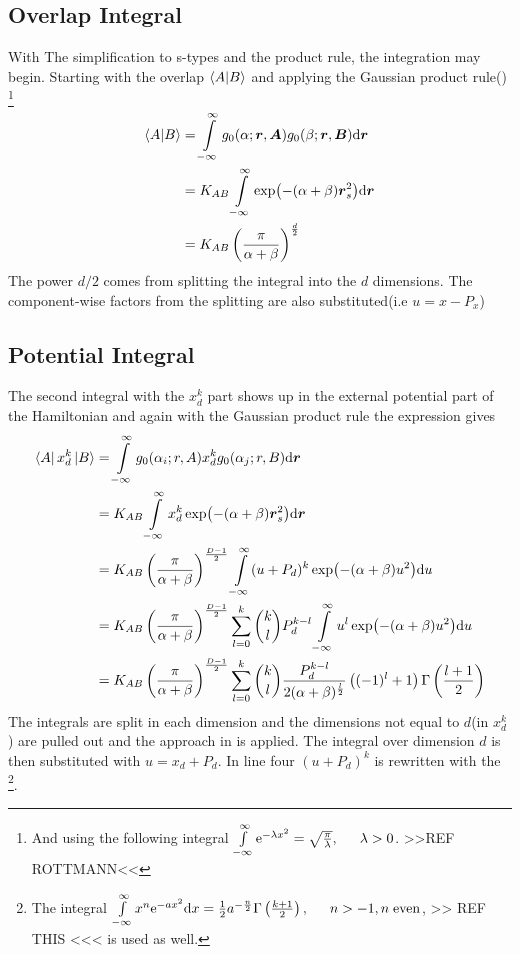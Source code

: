 \subsection{Overlap Integral\label{susec:overlapIntegral}}
    With The simplification to s-types and the product rule, the integration
    may begin. Starting with the overlap $\braket{A}{B}$ and applying the
    Gaussian product rule() \footnote{And using the
    following integral $\infint \me^{-\lambda x^2} =
    \sqrt{\frac{\pi}{\lambda}},\indent \lambda>0$. >>REF ROTTMANN<<}
        \begin{align}
            \braket{A}{B} &= \int\limits^{\infty}_{-\infty} g_0(\alpha;\boldsymbol{{r}},\boldsymbol{{A}})
            g_0(\beta;\boldsymbol{{r}},\boldsymbol{{B}}) \mathrm{d}\boldsymbol{{r}} \nonumber \\
            &= K_{AB}\int\limits^{\infty}_{-\infty} \exp(-(\alpha+\beta)\boldsymbol{{r}}^2_s) \mathrm{d} \boldsymbol{{r}}
            \nonumber \\
            &= K_{AB} \left(\frac{\pi}{\alpha+\beta}\right)^{\frac{d}{2}}
            \label{eq:stypeOverlap}
        \end{align}
    The power $d/2$ comes from splitting the integral into the $d$ dimensions.
    The component-wise factors from the splitting are also substituted(i.e
    $u=x-P_x$)

\subsection{Potential Integral}
    The second integral with the $x^k_d$ part shows up in the external
    potential part of the Hamiltonian and again with the Gaussian product rule
    the expression gives
        \begin{align}
            \bra{A}x^k_d\ket{B} &= \int\limits^{\infty}_{-\infty} g_0(\alpha_i;r,A) x^k_d
            g_0(\alpha_j;r,B) \mathrm{d} \boldsymbol{{r}} \nonumber \\
            &= K_{AB} \int\limits^{\infty}_{-\infty} x^k_d \exp(-(\alpha+\beta)\boldsymbol{{r}}^2_s)
            \mathrm{d}\boldsymbol{{r}} \nonumber \\
            &= K_{AB} \left(\frac{\pi}{\alpha+\beta}\right)^{\frac{D-1}{2}}
            \int\limits^{\infty}_{-\infty} (u+P_d)^k\exp(-(\alpha+\beta)u^2) \mathrm{d} u \nonumber \\
            &= K_{AB} \left(\frac{\pi}{\alpha+\beta}\right)^{\frac{D-1}{2}}
            \sum\limits_{l=0}^k {k\choose l} P^{k-l}_d \int\limits^{\infty}_{-\infty}
            u^l\exp(-(\alpha+\beta)u^2) \mathrm{d} u \nonumber \\
            &= K_{AB} \left(\frac{\pi}{\alpha+\beta}\right)^{\frac{D-1}{2}}
            \sum\limits_{l=0}^k {k\choose l}
            \frac{P^{k-l}_d}{2(\alpha+\beta)^{\frac{l}{2}}}
            \left((-1)^l+1\right) \Gamma\left(\frac{l+1}{2}\right)
        \end{align}
    The integrals are split in each dimension and the dimensions not equal to
    $d$(in $x^k_d$) are pulled out and the approach in  is
    applied. The integral over dimension $d$ is then substituted with
    $u=x_d+P_d$. In line four $(u+P_d)^k$ is rewritten with the \footnote{The integral $\infint x^n\me^{-ax^2}\md x =
    \frac{1}{2}a^{-\frac{n}{2}}\Gamma\left(\frac{k+1}{2}\right),\indent n>-1,
    n\;\text{even}$, >> REF THIS <<< is used as well.}.

